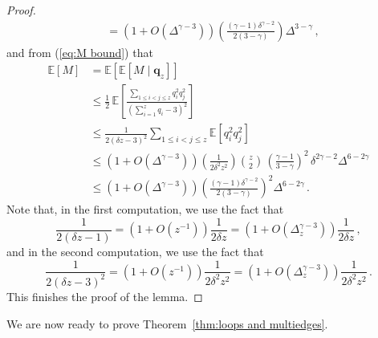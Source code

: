\documentclass[12pt]{article}
\theoremstyle{definition}
\theoremstyle{remark}
\theoremstyle{remark}
\numberwithin{theorem}{section}
\newcommand{\E}[1]{{\mathbb E}\left[#1\right]}
\newcommand{\Cexp}[2]{\mathbb{E}\left[ \left. #1 \; \right| \; #2 \right]}
\begin{document}
\begin{proof}
\begin{align*}
&=
(1+O(\Delta^{\gamma-3})) \left(\frac{(\gamma-1)\delta^{\gamma-2}}{2(3-\gamma)}\right) \Delta^{3-\gamma}\,,
\end{align*}
and from (\ref{eq:M bound}) that 
\begin{align*}
\E{M}
&=
\E{\Cexp{M}{\mathbf{q}_z}}\\
&\leq
\frac{1}{2} \, \E{ \frac{\sum_{1 \leq i < j \leq z} q_i^2 q_j^2}{\left( \sum_{i=1}^z q_i - 3 \right)^2} }\\
&\leq
\frac{1}{2(\delta z - 3)^2} \sum_{1 \leq i < j \leq z} \E{q_i^2 q_j^2}\\
&\leq 
(1+O(\Delta^{\gamma-3})) \left(\frac{1}{2\delta^2 z^2}\right) {z \choose 2}  \, \left(\frac{\gamma-1}{3-\gamma}\right)^2 \, \delta^{2\gamma - 2} \Delta^{6-2\gamma}\\
&\leq 
(1+O(\Delta^{\gamma-3})) \left(\frac{(\gamma-1)\delta^{\gamma-2}}{2(3-\gamma)}\right)^2 \Delta^{6-2\gamma} \,.
\end{align*}
Note that, in the first computation, we use the fact that 
\[
\frac{1}{2(\delta z - 1)} = (1+O(z^{-1})) \frac{1}{2 \delta z} = (1+O(\Delta_z^{\gamma-3})) \frac{1}{2 \delta z} \,,
\]
and in the second computation, we use the fact that 
\[
\frac{1}{2(\delta z - 3)^2} = (1+O(z^{-1})) \frac{1}{2 \delta^2 z^2} = (1+O(\Delta_z^{\gamma-3})) \frac{1}{2 \delta^2 z^2} \,.
\]
This finishes the proof of the lemma.
\end{proof}

We are now ready to prove Theorem~\ref{thm:loops and multiedges}.
\end{document}
